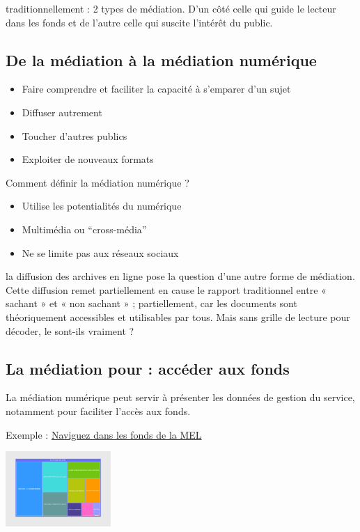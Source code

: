 \documentclass[
  letterpaper,
  DIV=11,
  numbers=noendperiod]{scrartcl}
\providecommand{\tightlist}{%
  \setlength{\itemsep}{0pt}\setlength{\parskip}{0pt}}\usepackage{longtable,booktabs,array}
\begin{document}
traditionnellement : 2 types de médiation. D'un côté celle qui guide le
lecteur dans les fonds et de l'autre celle qui suscite l'intérêt du
public.

\subsection{De la médiation à la médiation
numérique}\label{de-la-muxe9diation-uxe0-la-muxe9diation-numuxe9rique}

\begin{itemize}
\tightlist
\item
  Faire comprendre et faciliter la capacité à s'emparer d'un sujet
\item
  Diffuser autrement
\item
  Toucher d'autres publics
\item
  Exploiter de nouveaux formats
\end{itemize}

Comment définir la médiation numérique ?

\begin{itemize}
\tightlist
\item
  Utilise les potentialités du numérique
\item
  Multimédia ou ``cross-média''
\item
  Ne se limite pas aux réseaux sociaux
\end{itemize}

la diffusion des archives en ligne pose la question d'une autre forme de
médiation. Cette diffusion remet partiellement en cause le rapport
traditionnel entre « sachant » et « non sachant » ; partiellement, car
les documents sont théoriquement accessibles et utilisables par tous.
Mais sans grille de lecture pour décoder, le sont-ils vraiment ?

\subsection{La médiation pour : accéder aux
fonds}\label{la-muxe9diation-pour-accuxe9der-aux-fonds}

La médiation numérique peut servir à présenter les données de gestion du
service, notamment pour faciliter l'accès aux fonds.

Exemple :
\href{https://archives.lillemetropole.fr/n/navigation-dans-les-fonds/n:512}{Naviguez
dans les fonds de la MEL}

\begin{center}
\includegraphics[width=0.3\textwidth,height=\textheight]{img/mel_fonds.png}
\end{center}
\end{document}
